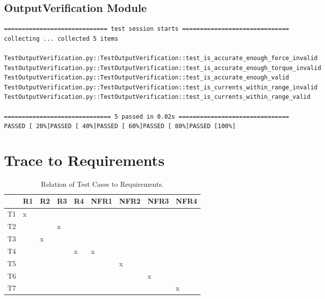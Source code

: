 \documentclass[12pt, titlepage]{article}
\begin{document}
\subsection{OutputVerification Module}
\begin{small}
\begin{verbatim}
============================= test session starts ==============================
collecting ... collected 5 items

TestOutputVerification.py::TestOutputVerification::test_is_accurate_enough_force_invalid 
TestOutputVerification.py::TestOutputVerification::test_is_accurate_enough_torque_invalid 
TestOutputVerification.py::TestOutputVerification::test_is_accurate_enough_valid 
TestOutputVerification.py::TestOutputVerification::test_is_currents_within_range_invalid 
TestOutputVerification.py::TestOutputVerification::test_is_currents_within_range_valid 

============================== 5 passed in 0.02s ===============================
PASSED [ 20%]PASSED [ 40%]PASSED [ 60%]PASSED [ 80%]PASSED [100%]

\end{verbatim}
\end{small}

\section{Trace to Requirements}
\begin{table}[H]
  \centering
  \caption{Relation of Test Cases to Requirements.}
  \vspace{2mm}
  \label{tab:req_trace}
  \begin{tabular}{|l|l|l|l|l|l|l|l|l|} %
  \hline
     & R1 & R2 & R3 & R4 & NFR1 & NFR2 & NFR3 & NFR4 \\ \hline
  T1 & x  &    &    &    &      &      &      &      \\ \hline
  T2 &    &    &  x  &    &      &      &      &      \\ \hline
  T3 &    &  x  &    &    &      &      &      &      \\ \hline
  T4 &    &    &    &  x  &  x    &      &      &      \\ \hline
  T5 &    &    &    &    &      &   x   &      &      \\ \hline
  T6 &    &    &    &    &      &      &   x   &      \\ \hline
  T7 &    &    &    &    &      &      &      &   x   \\ \hline
  \end{tabular}
\end{table}
		
\end{document}
